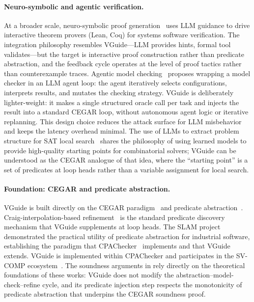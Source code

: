 \paragraph{Neuro-symbolic and agentic verification.}
At a broader scale, neuro-symbolic proof generation~\cite{neurosymbolic2026} uses
LLM guidance to drive interactive theorem provers (Lean, Coq) for systems software
verification. The integration philosophy resembles VGuide---LLM provides hints,
formal tool validates---but the target is interactive proof construction rather than
predicate abstraction, and the feedback cycle operates at the level of proof tactics
rather than counterexample traces. Agentic model checking~\cite{agenticmc2026}
proposes wrapping a model checker in an LLM agent loop: the agent iteratively
selects configurations, interprets results, and mutates the checking strategy. VGuide
is deliberately lighter-weight: it makes a single structured oracle call per task and
injects the result into a standard CEGAR loop, without autonomous agent logic or
iterative replanning. This design choice reduces the attack surface for LLM
misbehavior and keeps the latency overhead minimal. The use of LLMs to extract
problem structure for SAT local search~\cite{satllm2025} shares the philosophy of
using learned models to provide high-quality starting points for combinatorial
solvers; VGuide can be understood as the CEGAR analogue of that idea, where the
``starting point'' is a set of predicates at loop heads rather than a variable
assignment for local search.

\paragraph{Foundation: CEGAR and predicate abstraction.}
VGuide is built directly on the CEGAR paradigm~\cite{cegar2003} and predicate
abstraction~\cite{predabstraction1997}. Craig-interpolation-based
refinement~\cite{interpolation2003} is the standard predicate discovery mechanism
that VGuide supplements at loop heads. The SLAM project~\cite{slam2002} demonstrated
the practical utility of predicate abstraction for industrial software, establishing
the paradigm that CPAChecker~\cite{cpachecker2011} implements and that VGuide extends.
VGuide is implemented within CPAChecker and participates in the SV-COMP
ecosystem~\cite{svcomp2022}. The soundness arguments in  rely
directly on the theoretical foundations of these works: VGuide does not modify the
abstraction--model-check--refine cycle, and its predicate injection step respects
the monotonicity of predicate abstraction that underpins the CEGAR soundness proof.

